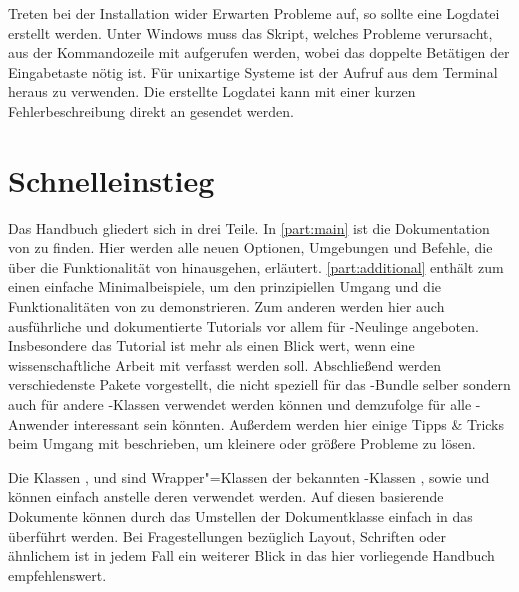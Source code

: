 Treten bei der Installation wider Erwarten Probleme auf, so sollte eine 
Logdatei erstellt werden. Unter Windows muss das Skript, welches Probleme 
verursacht, aus der Kommandozeile mit
 aufgerufen werden, wobei das 
doppelte Betätigen der Eingabetaste nötig ist. Für unixartige Systeme 
ist der Aufruf  aus dem 
Terminal heraus zu verwenden. Die erstellte Logdatei kann mit einer kurzen 
Fehlerbeschreibung direkt an \Email{\tudscrmail} gesendet werden.
%


\section{Schnelleinstieg}
Das Handbuch gliedert sich in drei Teile. In \autoref{part:main} ist die 
Dokumentation von \TUDScript zu finden. Hier werden alle neuen Optionen, 
Umgebungen und Befehle, die über die Funktionalität von \KOMAScript{} 
hinausgehen, erläutert. \autoref{part:additional} enthält zum einen einfache 
Minimalbeispiele, um den prinzipiellen Umgang und die Funktionalitäten von 
\TUDScript zu demonstrieren. Zum anderen werden hier auch ausführliche und 
dokumentierte Tutorials vor allem für -Neulinge angeboten. 
Insbesondere das Tutorial  ist mehr als einen Blick wert, 
wenn eine wissenschaftliche Arbeit mit  verfasst werden soll.
Abschließend werden verschiedenste Pakete vorgestellt, die nicht speziell für 
das \TUDScript-Bundle selber sondern auch für andere -Klassen
verwendet werden können und demzufolge für alle -Anwender 
interessant sein könnten. Außerdem werden hier einige Tipps \& Tricks beim 
Umgang mit  beschrieben, um kleinere oder größere Probleme zu 
lösen.

Die Klassen ,  und  
sind Wrapper"=Klassen der bekannten \KOMAScript-Klassen , 
 sowie  und können einfach anstelle deren 
verwendet werden. Auf diesen basierende Dokumente können durch das Umstellen 
der Dokumentklasse einfach in das \TUDCD überführt werden. Bei Fragestellungen 
bezüglich Layout, Schriften oder ähnlichem ist in jedem Fall ein weiterer Blick 
in das hier vorliegende Handbuch empfehlenswert.
